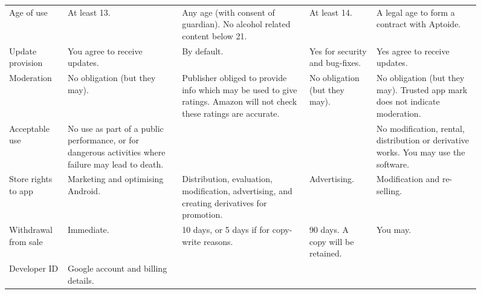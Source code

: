 \documentclass[a4paper]{scrartcl}
\begin{document}
\begin{figure}[!h]
\begin{tabulary}{\linewidth}{lLLLL}
Age of use           & At least 13.
                     & Any age (with consent of guardian).  No alcohol related content below 21.
                     & At least 14.
                     & A legal age to form a contract with Aptoide.                                                                                                                      \\ \addlinespace
Update provision     & You agree to receive updates.
                     & By default.
                     & Yes for security and bug-fixes.
                     & Yes agree to receive updates.                                                                                                                                     \\ \addlinespace
Moderation           & No obligation (but they may).
                     & Publisher obliged to provide info which may be used to give ratings.  Amazon will not check these ratings are accurate.
                     & No obligation (but they may).
                     & No obligation (but they may).  Trusted app mark does not indicate moderation.                                                                                     \\ \addlinespace
Acceptable use       & No use as part of a public performance, or for dangerous activities where failure may lead to death.
                     &
                     &
                     & No modification, rental, distribution or derivative works.  You may use the software.                                                                             \\ \addlinespace
Store rights to app  & Marketing and optimising Android.
                     & Distribution, evaluation, modification, advertising, and creating derivatives for promotion.
                     & Advertising.
                     & Modification and re-selling.                                                                                                                                      \\ \addlinespace
Withdrawal from sale & Immediate.
                     & 10 days, or 5 days if for copy-write reasons.
                     & 90 days. A copy will be retained.
                     & You may.                                                                                                                                                          \\ \addlinespace
Developer ID         & Google account and billing details.

\end{tabulary}
\end{figure}
\end{document}

